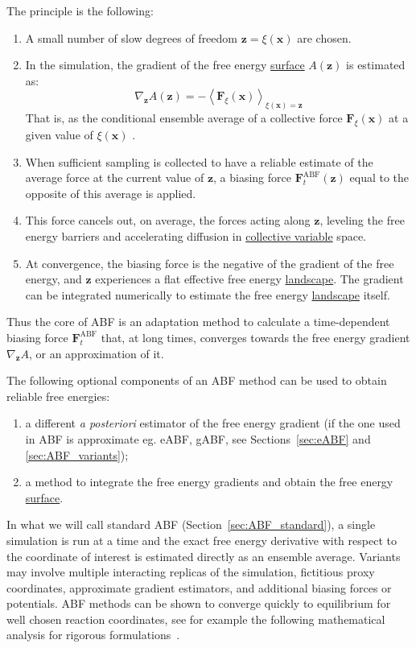 \documentclass[9pt,review]{livecoms}
\newcommand{\vx}{\mathbf{x}}
\newcommand{\vz}{\mathbf{z}}
\newcommand{\vF}{\mathbf{F}}
\begin{document}
The principle is the following:
\begin{enumerate}
 \item A small number of slow degrees of freedom $\vz=\xi(\vx)$  are chosen.
 \item In the simulation, the gradient of the free energy \hyperlink{ref:FES} {surface} $A(\vz)$  is estimated as:
\begin{equation}
    \nabla_\vz A(\vz) = - \left\langle \vF_\xi(\vx)  \right\rangle_{\xi(\vx) = \vz}
\end{equation}
That is, as the conditional ensemble average of a collective force $\vF_\xi(\vx)$ at a given value of $\xi(\vx)$ .
 \item When sufficient sampling is collected to have a reliable estimate of the average force at the current value of $\vz$, a biasing force $\vF^\mathrm{ABF}_t(\vz)$ equal to the opposite of this average is applied.
 \item This force cancels out, on average, the forces acting along $\vz$, leveling the free energy barriers and accelerating diffusion in \hyperlink{ref:CV} {collective variable} space.
 \item At convergence, the biasing force is the negative of the gradient of the free energy, and $\vz$ experiences a flat effective free energy \hyperlink{ref:FES} {landscape}. The gradient can be integrated numerically to estimate the free energy \hyperlink{ref:FES} {landscape} itself.
\end{enumerate}

Thus the core of ABF is an adaptation method to calculate a time-dependent biasing force $\vF^\mathrm{ABF}_t$ that, at long times, converges towards the free energy gradient $\nabla_\vz A$, or an approximation of it.

The following optional components of an ABF method can be used to obtain reliable free energies:
\begin{enumerate}
\item a different \textit{a posteriori} estimator of the free energy gradient (if the one used in ABF is approximate eg. eABF, gABF, see Sections~\ref{sec:eABF} and \ref{sec:ABF_variants});
\item a method to integrate the free energy gradients and obtain the free energy \hyperlink{ref:FES} {surface}.\cite{Henin2021integration}
\end{enumerate}

In what we will call standard ABF (Section~\ref{sec:ABF_standard}), a single simulation is run at a time and the exact free energy derivative with respect to the coordinate of interest is estimated directly as an ensemble average.
Variants may involve multiple interacting replicas of the simulation, fictitious proxy coordinates, approximate gradient estimators, and additional biasing forces or potentials. ABF methods can be shown to converge quickly to equilibrium for well chosen reaction coordinates, see for example the following mathematical analysis for rigorous formulations~\cite{lelievre-rousset-stoltz-08,benaim-brehier-monmarche-20}.
\end{document}
